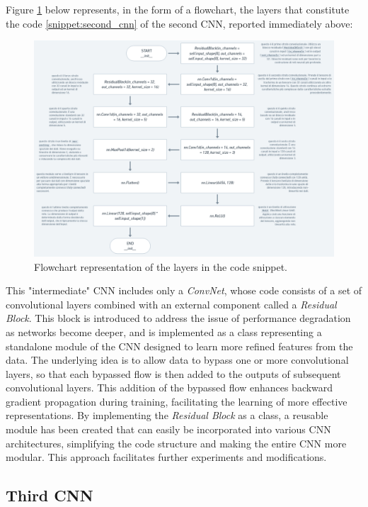 \documentclass[12pt,italian]{report}
\begin{document}
Figure \ref{fig:second_cnn_layers} below represents, in the form of a flowchart, the layers that constitute the code \ref{snippet:second_cnn} of the second CNN, reported immediately above:

\begin{figure}[H]
    \centering
    \includegraphics[width=1\textwidth]{images/second_cnn_layers.png}
    \captionsetup{justification=centering}
    \caption{Flowchart representation of the layers in the code snippet.}
    \label{fig:second_cnn_layers}
\end{figure}

This "intermediate" CNN includes only a \textit{ConvNet}, whose code consists of a set of convolutional layers combined with an external component called a \textit{Residual Block}. This block is introduced to address the issue of performance degradation as networks become deeper, and is implemented as a class representing a standalone module of the CNN designed to learn more refined features from the data. The underlying idea is to allow data to bypass one or more convolutional layers, so that each bypassed flow is then added to the outputs of subsequent convolutional layers. This addition of the bypassed flow enhances backward gradient propagation during training, facilitating the learning of more effective representations.
By implementing the \textit{Residual Block} as a class, a reusable module has been created that can easily be incorporated into various CNN architectures, simplifying the code structure and making the entire CNN more modular. This approach facilitates further experiments and modifications.

\subsection{Third CNN}
\label{subsec:third_cnn}
\end{document}
